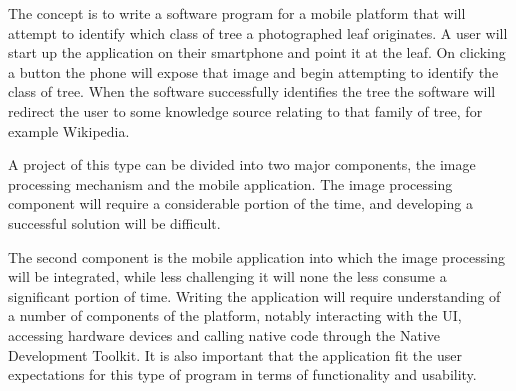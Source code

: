 The concept is to write a software program for a mobile platform that will attempt to identify which class of tree a photographed leaf originates. A user will start up the application on their smartphone and point it at the leaf. On clicking a button the phone will expose that image and begin attempting to identify the class of tree. When the software successfully identifies the tree the software will redirect the user to some knowledge source relating to that family of tree, for example Wikipedia.

A project of this type can be divided into two major components, the image processing mechanism and the mobile application. The image processing component will require a considerable portion of the time, and developing a successful solution will be difficult.

The second component is the mobile application into which the image processing will be integrated, while less challenging it will none the less consume a significant portion of time. Writing the application will require understanding of a number of components of the platform, notably interacting with the UI, accessing hardware devices and calling native code through the Native Development Toolkit. It is also important that the application fit the user expectations for this type of program in terms of functionality and usability.






